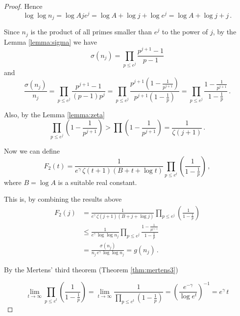 \documentclass{article}
\begin{document}
\begin{theorem}
\begin{proof}
Hence
\begin{equation*}
\label{eq:lognj}
    \log \log n_j = \log Aje^j = \log A + \log j + \log e^j = \log A + \log j + j\,.
\end{equation*}

Since $n_j$ is the product of all primes smaller than $e^j$ to the power of $j$, by the Lemma \ref{lemma:sigma} we have
\begin{equation*}
    \sigma(n_j) = \prod_{p\leq e^j} \frac{p^{j+1}-1}{p-1}
\end{equation*}
and
\begin{equation*}
    \frac{\sigma(n_j)}{n_j} = \prod_{p\leq e^j} \frac{p^{j+1}-1}{(p-1)p^j} = \prod_{p\leq e^j} \frac{p^{j+1}\left(1-\frac{1}{p^{j+1}}\right)}{p^{j+1}\left(1-\frac{1}{p}\right)} = \prod_{p\leq e^j} \frac{1-\frac{1}{p^{j+1}}}{1-\frac{1}{p}}\,.
\end{equation*}

Also, by the Lemma \ref{lemma:zeta}
\begin{equation*}
    \prod_{p\leq e^j}\left(1-\frac{1}{p^{j+1}}\right) > \prod \left(1-\frac{1}{p^{j+1}}\right) = \frac{1}{\zeta(j+1)}\,.
\end{equation*}

Now we can define
\begin{equation*}
    F_2(t)=\frac{1}{e^\gamma\,\zeta(t+1)(B+t+\log t)} \prod_{p\leq e^t} \left(\frac{1}{1-\frac{1}{p}}\right)\,,
\end{equation*}
where $B=\log A$ is a suitable real constant.

This is, by combining the results above
\begin{align*}
    F_2(j)& = \frac{1}{e^\gamma\,\zeta(j+1)(B+j+\log j)} \prod_{p\leq e^j} \left(\frac{1}{1-\frac{1}{p}}\right)\\
    & \leq \frac{1}{e^\gamma\,\log \log n_j} \prod_{p\leq e^j} \frac{1-\frac{1}{p^{j+1}}}{1-\frac{1}{p}}\\
    & = \frac{\sigma(n_j)}{n_j\,e^\gamma\,\log \log n_j} = g(n_j)\,.
\end{align*}

By the Mertens' third theorem (Theorem \ref{thm:mertens3})

\begin{equation*}
    \lim_{t \rightarrow \infty} \prod_{p\leq e^t} \left(\frac{1}{1-\frac{1}{p}}\right) = \lim_{t \rightarrow \infty} \frac{1}{\prod_{p\leq e^t} \left(1-\frac{1}{p}\right)} = \left(\frac{e^{-\gamma}}{\log e^t}\right)^{-1} = e^\gamma\,t
\end{equation*}


\end{proof}
\end{theorem}
\end{document}
